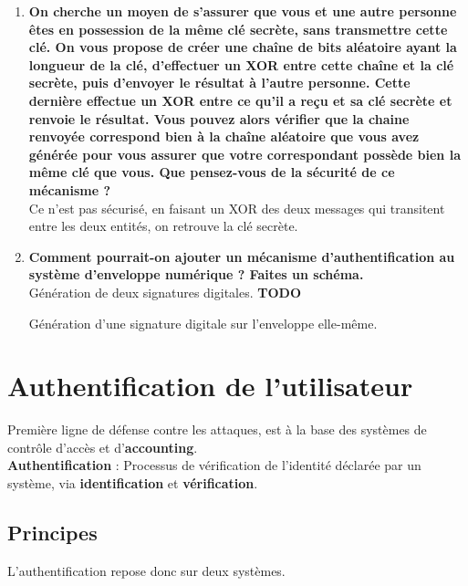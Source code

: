 \documentclass{report}
\begin{document}
			\begin{enumerate}
				\item \textbf{On cherche un moyen de s’assurer que vous et une autre personne êtes en possession de la même clé secrète, sans transmettre cette clé. On vous propose de créer une chaîne de bits aléatoire ayant la longueur de la clé, d’effectuer un XOR entre cette chaîne et la clé secrète, puis d’envoyer le résultat à l’autre personne. Cette dernière effectue un XOR entre ce qu’il a reçu et sa clé secrète et renvoie le résultat. Vous pouvez alors vérifier que la chaine renvoyée correspond bien à la chaîne aléatoire que vous avez générée pour vous assurer que votre correspondant possède bien la même clé que vous. Que pensez-vous de la sécurité de ce mécanisme ?}\\

					Ce n'est pas sécurisé, en faisant un XOR des deux messages qui transitent entre les deux entités, on retrouve la clé secrète.\\

				\item \textbf{Comment pourrait-on ajouter un mécanisme d’authentification au système d’enveloppe numérique ? Faites un schéma.}\\

					Génération de deux signatures digitales. \textbf{TODO}

					Génération d'une signature digitale sur l'enveloppe elle-même.


			\end{enumerate}

\chapter{Authentification de l'utilisateur}

	Première ligne de défense contre les attaques, est à la base des systèmes de contrôle d'accès et d'\textbf{accounting}.\\

	\textbf{Authentification} : Processus de vérification de l'identité déclarée par un système, via \textbf{identification} et \textbf{vérification}.\\ 

	\section{Principes}

		L'authentification repose donc sur deux systèmes.\\
\end{document}

